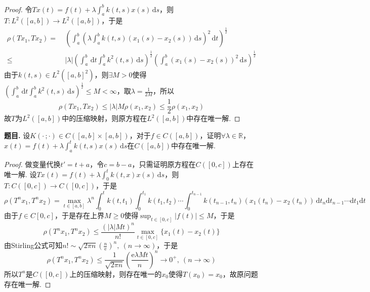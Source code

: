 \documentclass[12pt, a4paper, oneside]{ctexart}
\newcounter{problem}  %
\newenvironment{problem}{\stepcounter{problem}\par\noindent\textbf{题目\arabic{problem}. }}{\smallskip\par}
\let\leq=\leqslant %
\let\geq=\geqslant %
\def\R{\mathbb{R}}          %
\def\d{\mathrm{d}}          %
\def\e{\mathrm{e}}          %
\def\add{\vspace{1ex}}      %
\begin{document}
\begin{proof}
    令$Tx(t) = f(t)+\lambda \int_a^b k(t, s)x(s)\,\d s$，则$T:L^2([a,b])\to L^2([a,b])$，于是 
    \begin{align*}
        \rho(Tx_1,Tx_2)=&\ \left(\int_a^b\left(\lambda\int_a^bk(t,s)(x_1(s)-x_2(s))\,\d s\right)^2\,\d t\right)^{\frac{1}{2}}\\
        \leq&\ |\lambda|\left(\int_a^b\,\d t\int_a^bk^2(t,s)\,\d s\right)^{\frac{1}{2}}\left(\int_a^b(x_1(s)-x_2(s))^2\,\d s\right)^{\frac{1}{2}}
    \end{align*}
    由于$k(t,s)\in L^2([a,b]^2)$，则$\exists M > 0$使得$\left(\int_a^b\,\d t\int_a^bk^2(t,s)\,\d s\right)^{\frac{1}{2}}\leq M < \infty$，取$\lambda = \frac{1}{2M}$，所以
    \begin{equation*}
        \rho(Tx_1,Tx_2)\leq |\lambda|M\rho(x_1,x_2)\leq \frac{1}{2}\rho(x_1,x_2)
    \end{equation*}
    故$T$为$L^2([a,b])$中的压缩映射，则原方程在$L^2([a,b])$中存在唯一解.
\end{proof}
\begin{problem}
    设$K(\cdot\, ;\cdot )\in C([a,b]\times [a,b])$，对于$f\in C([a,b])$，证明$\forall \lambda \in \R$，\add\\
    $x(t)= f(t)+\lambda\int_a^t k(t,s)x(s)\,\d s$在$C([a,b])$中存在唯一解.
\end{problem}
\begin{proof}
    做变量代换$t'=t+a$，令$c=b-a$，只需证明原方程在$C([0,c])$上存在唯一解. 设$Tx(t) = f(t)+\lambda \int_0^t k(t,x)x(s)\,\d s$，则$T:C([0,c])\to C([0,c])$，于是
    \begin{equation*}
        \rho(T^nx_1,T^nx_2) = \max_{t\in[a,b]}\lambda^n\int_0^tk(t,t_1)\int_0^{t_1}k(t_1,t_2)\cdots\int_0^{t_{n-1}}k(t_{n-1}, t_n)(x_1(t_n) - x_2(t_n))\,\d t_n\d t_{n-1}\cdots\d t_1\d t
    \end{equation*}
    由于$f\in C[0,c]$，于是存在上界$M\geq 0$使得$\sup_{t\in[0,c]}|f(t)|\leq M$，于是
    \begin{equation*}
        \rho(T^nx_1,T^nx_2)\leq \frac{(|\lambda|Mt)^n}{n!}\max_{t\in[0,c]}\{x_1(t)-x_2(t)\}
    \end{equation*}
    由Stirling公式可知$n!\sim \sqrt{2\pi n}\left(\frac{n}{\e}\right)^n,\ (n\to\infty)$，于是
    \begin{equation*}
        \rho(T^nx_1,T^nx_2)\leq \frac{1}{\sqrt{2\pi n}}\left(\frac{\e \lambda M t}{n}\right)^n\to 0^+,\ (n\to\infty)
    \end{equation*}
    所以$T^n$是$C([0,c])$上的压缩映射，则存在唯一的$x_0$使得$T(x_0)=x_0$，故原问题存在唯一解.
\end{proof}
\end{document}
